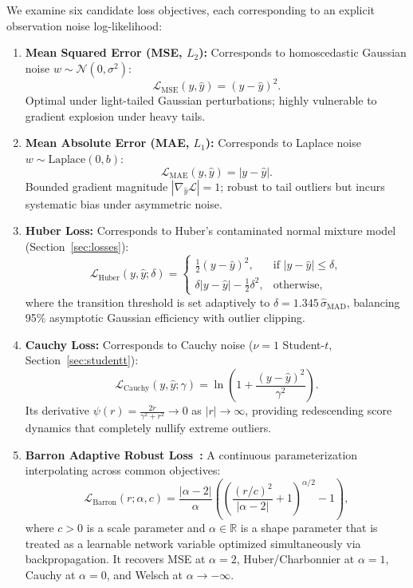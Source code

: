 We examine six candidate loss objectives, each corresponding to an explicit observation noise log-likelihood:
\begin{enumerate}
  \item \textbf{Mean Squared Error (MSE, $L_2$):} Corresponds to homoscedastic Gaussian noise $w \sim \mathcal{N}(0, \sigma^2)$:
  \begin{equation}
    \mathcal{L}_{\text{MSE}}(y, \hat{y}) = (y - \hat{y})^2.
  \end{equation}
  Optimal under light-tailed Gaussian perturbations; highly vulnerable to gradient explosion under heavy tails.

  \item \textbf{Mean Absolute Error (MAE, $L_1$):} Corresponds to Laplace noise $w \sim \text{Laplace}(0, b)$:
  \begin{equation}
    \mathcal{L}_{\text{MAE}}(y, \hat{y}) = |y - \hat{y}|.
  \end{equation}
  Bounded gradient magnitude $|\nabla_{\hat{y}}\mathcal{L}| = 1$; robust to tail outliers but incurs systematic bias under asymmetric noise.

  \item \textbf{Huber Loss:} Corresponds to Huber's contaminated normal mixture model (Section~\ref{sec:losses}):
  \begin{equation}
    \mathcal{L}_{\text{Huber}}(y, \hat{y}; \delta) = 
    \begin{cases}
      \frac{1}{2}(y - \hat{y})^2, & \text{if } |y - \hat{y}| \leq \delta, \\
      \delta |y - \hat{y}| - \frac{1}{2}\delta^2, & \text{otherwise},
    \end{cases}
  \end{equation}
  where the transition threshold is set adaptively to $\delta = 1.345\,\hat{\sigma}_{\text{MAD}}$, balancing 95\% asymptotic Gaussian efficiency with outlier clipping.

  \item \textbf{Cauchy Loss:} Corresponds to Cauchy noise ($\nu=1$ Student-$t$, Section~\ref{sec:studentt}):
  \begin{equation}
    \mathcal{L}_{\text{Cauchy}}(y, \hat{y}; \gamma) = \ln\left(1 + \frac{(y - \hat{y})^2}{\gamma^2}\right).
  \end{equation}
  Its derivative $\psi(r) = \frac{2r}{\gamma^2 + r^2} \to 0$ as $|r| \to \infty$, providing redescending score dynamics that completely nullify extreme outliers.

  \item \textbf{Barron Adaptive Robust Loss~\cite{barron}:} A continuous parameterization interpolating across common objectives:
  \begin{equation}
    \mathcal{L}_{\text{Barron}}(r; \alpha, c) = \frac{|\alpha - 2|}{\alpha} \left( \left(\frac{(r/c)^2}{|\alpha - 2|} + 1\right)^{\alpha/2} - 1 \right),
  \end{equation}
  where $c > 0$ is a scale parameter and $\alpha \in \mathbb{R}$ is a shape parameter that is treated as a learnable network variable optimized simultaneously via backpropagation. It recovers MSE at $\alpha = 2$, Huber/Charbonnier at $\alpha = 1$, Cauchy at $\alpha = 0$, and Welsch at $\alpha \to -\infty$.


\end{enumerate}
